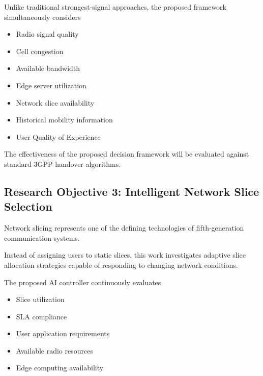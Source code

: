 \documentclass[12pt,a4paper]{article}\usepackage[a4paper,margin=1in]{geometry}\usepackage{graphicx}\usepackage{longtable}\usepackage{booktabs}\usepackage{hyperref}\usepackage{enumitem}\usepackage{amsmath}\usepackage{tikz}\usepackage{pgfgantt}\usepackage{setspace}\setstretch{1.15}\usetikzlibrary{positioning,arrows.meta,shapes.geometric}
\begin{document}
	Unlike traditional strongest-signal approaches, the proposed framework simultaneously considers
	
	\begin{itemize}
		
		\item Radio signal quality
		
		\item Cell congestion
		
		\item Available bandwidth
		
		\item Edge server utilization
		
		\item Network slice availability
		
		\item Historical mobility information
		
		\item User Quality of Experience
		
	\end{itemize}
	
	The effectiveness of the proposed decision framework will be evaluated against standard 3GPP handover algorithms.
	
	
	\subsection{Research Objective 3: Intelligent Network Slice Selection}
	
	Network slicing represents one of the defining technologies of fifth-generation communication systems.
	
	Instead of assigning users to static slices, this work investigates adaptive slice allocation strategies capable of responding to changing network conditions.
	
	The proposed AI controller continuously evaluates
	
	\begin{itemize}
		
		\item Slice utilization
		
		\item SLA compliance
		
		\item User application requirements
		
		\item Available radio resources
		
		\item Edge computing availability
		
	\end{itemize}
	
\end{document}
